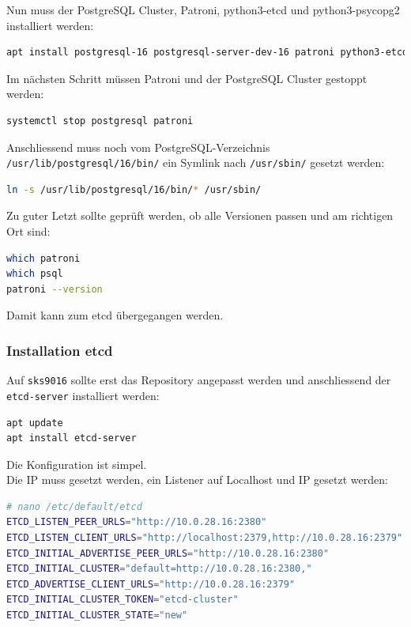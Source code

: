Nun muss der \Gls{PostgreSQL Cluster}, Patroni, python3-etcd und python3-psycopg2 installiert werden:
\lstset{style=gra_codestyle}
\begin{lstlisting}[language=bash, caption=Patroni - Prerequisites installieren,captionpos=b,label={lst:patroni-prerequisites-install},breaklines=true]
apt install postgresql-16 postgresql-server-dev-16 patroni python3-etcd python3-psycopg2
\end{lstlisting}

Im nächsten Schritt müssen Patroni und der \Gls{PostgreSQL Cluster} gestoppt werden:
\lstset{style=gra_codestyle}
\begin{lstlisting}[language=bash, caption=Patroni - Stop Patroni und PostgreSQL,captionpos=b,label={lst:patroni-stop-postgresql-patroni},breaklines=true]
systemctl stop postgresql patroni
\end{lstlisting}

Anschliessend muss noch vom PostgreSQL-Verzeichnis \texttt{/usr/lib/postgresql/16/bin/} ein Symlink nach \texttt{/usr/sbin/} gesetzt werden:
\lstset{style=gra_codestyle}
\begin{lstlisting}[language=bash, caption=Patroni - Symlink binaries,captionpos=b,label={lst:patroni_symlink_bins},breaklines=true]
ln -s /usr/lib/postgresql/16/bin/* /usr/sbin/
\end{lstlisting}

Zu guter Letzt sollte geprüft werden, ob alle Versionen passen und am richtigen Ort sind:
\lstset{style=gra_codestyle}
\begin{lstlisting}[language=bash, caption=Patroni - Checks,captionpos=b,label={lst:patroni-checks},breaklines=true]
which patroni
which psql
patroni --version
\end{lstlisting}
Damit kann zum \gls{etcd} übergegangen werden.

\subsubsection{Installation etcd}
Auf \texttt{sks9016} sollte erst das Repository angepasst werden und anschliessend der \texttt{etcd-server} installiert werden:
\lstset{style=gra_codestyle}
\begin{lstlisting}[language=bash, caption=etcd - Installation,captionpos=b,label={lst:etcd_install},breaklines=true]
apt update
apt install etcd-server
\end{lstlisting}

Die Konfiguration ist simpel.\\
Die IP muss gesetzt werden, ein Listener auf Localhost und IP gesetzt werden:
\lstset{style=gra_codestyle}
\begin{lstlisting}[language=bash, caption=etcd - Konfiguration,captionpos=b,label={lst:etcd_configuration},breaklines=true]
# nano /etc/default/etcd
ETCD_LISTEN_PEER_URLS="http://10.0.28.16:2380"
ETCD_LISTEN_CLIENT_URLS="http://localhost:2379,http://10.0.28.16:2379"
ETCD_INITIAL_ADVERTISE_PEER_URLS="http://10.0.28.16:2380"
ETCD_INITIAL_CLUSTER="default=http://10.0.28.16:2380,"
ETCD_ADVERTISE_CLIENT_URLS="http://10.0.28.16:2379"
ETCD_INITIAL_CLUSTER_TOKEN="etcd-cluster"
ETCD_INITIAL_CLUSTER_STATE="new"
\end{lstlisting}


